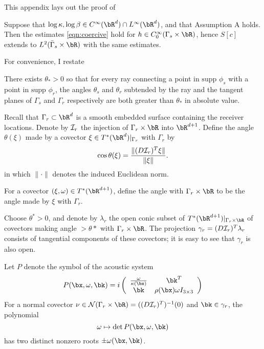 This appendix lays out the proof of 

\begin{theorem} 
\label{thm:one}
Suppose that $\log \kappa, \log \beta \in C^{\infty}(\bR^d) \cap L^{\infty}(\bR^d)$, and that Assumption A holds. Then the estimates \ref{eqn:coercive} hold for $h \in C^{\infty}_0(\Gamma_s \times \bR)$, hence $S[c]$ extends to $L^2(\bar{\Gamma}_s \times \bR)$ with the same estimates.
\end{theorem}

For convenience, I restate

 There exists $\theta_*>0$ so that for every ray connecting a point in $\mbox{supp }\phi_s$ with a point in $\mbox{supp }\phi_r$, the angles $\theta_s$ and $\theta_r$ subtended by the ray and the tangent planes of $\Gamma_s$ and $\Gamma_r$ respectively are both greater than $\theta_*$ in absolute value.

Recall that $\Gamma_r \subset \bR^d$ is a smooth embedded surface containing the receiver locations. Denote by 
${\cal I}_r$ the injection of $\Gamma_r \times \bR$ into $\bR^{d+1}$. Define the angle $\theta(\xi)$ made by a covector $\xi \in T^*(\bR^d)|_{\Gamma_r}$ with $\Gamma_r$ by 
\begin{equation}
\label{eqn:angledef}
\cos \theta(\xi) = \frac{\|  (D{\cal I}_r)^T\xi\|}{\|\xi\|}.
\end{equation}
in which $\| \cdot \|$ denotes the induced Euclidean norm.

For a covector $(\xi,\omega) \in  T^*(\bR^{d+1})$, define the angle with $\Gamma_r \times \bR$ to be the angle made by $\xi$ with $\Gamma_r$.

Choose $\theta^*>0$, and denote by $\lambda_r$ the open conic subset of $T^*(\bR^{d+1}) |_{\Gamma_r \times \bR}$ of covectors making angle $> \theta*$ with $\Gamma_r \times \bR$. The projection $\gamma_r = (D{\cal I}_r)^T\lambda_r$ consists of tangential components of these covectors; it is easy to see that $\gamma_r$ is also open. 

Let $P$ denote the symbol of the acoustic system
\begin{equation}
P(\bx,\omega,\bk) = 
i\left(
\begin{array}{cc}
\frac{\omega}{\kappa(\bx)} & \bk^T\\
\bk &  \rho(\bx)\omega I_{3\times3}
\end{array}
\right)
\end{equation}
For a normal covector $\nu \in {\cal N}(\Gamma_r \times \bR)  = ((D{\cal I}_r)^T)^{-1}(0)$ and $\bk \in \gamma_r$, the polynomial
\[
\omega \mapsto \det P(\bx,\omega,\bk)
\]
has two distinct nonzero roots $\pm \omega(\bx,\bk)$. 

